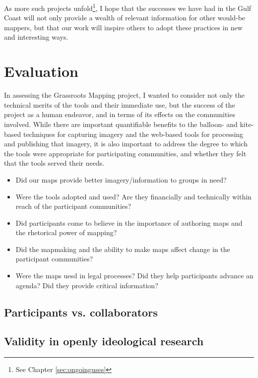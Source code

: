 \documentclass[11pt,oneside,notitlepage]{report}
\begin{document}
As more such projects unfold\footnote{See Chapter \ref{sec:ongoinguses}}, I hope that the successes we have had in the Gulf Coast will not only provide a wealth of relevant information for other would-be mappers, but that our work will inspire others to adopt these practices in new and interesting ways.  

\chapter{Evaluation}

In assessing the Grassroots Mapping project, I wanted to consider not only the technical merits of the tools and their immediate use, but the success of the project as a human endeavor, and in terms of its effects on the communities involved. While there are important quantifiable benefits to the balloon- and kite-based techniques for capturing imagery and the web-based tools for processing and publishing that imagery, it is also important to address the degree to which the tools were appropriate for participating communities, and whether they felt that the tools served their needs. 

\begin{itemize}
\item Did our maps provide better imagery/information to groups in need?
\item Were the tools adopted and used? Are they financially and technically within reach of the participant communities? 
\item Did participants come to believe in the importance of authoring maps and the rhetorical power of mapping?
\item Did the mapmaking and the ability to make maps affect change in the participant communities?
\item Were the maps uesd in legal processes? Did they help participants advance an agenda? Did they provide critical information?
\end{itemize}

\section{Participants vs. collaborators}


\section{Validity in openly ideological research}
\label{sec:lather}
\end{document}
